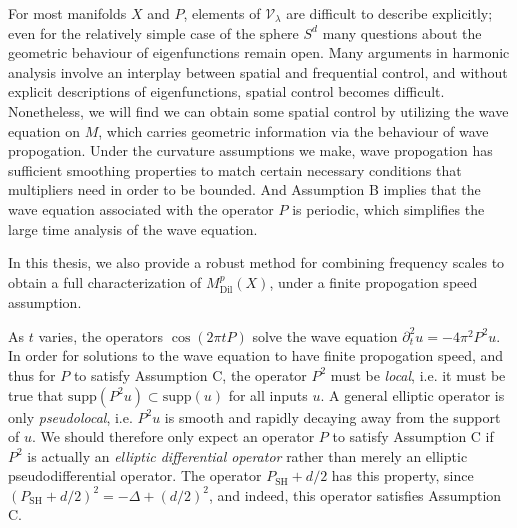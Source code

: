 % 

For most manifolds $X$ and $P$, elements of $\mathcal{V}_\lambda$ are difficult to describe explicitly; even for the relatively simple case of the sphere $S^d$ many questions about the geometric behaviour of eigenfunctions remain open. Many arguments in harmonic analysis involve an interplay between spatial and frequential control, and without explicit descriptions of eigenfunctions, spatial control becomes difficult. Nonetheless, we will find we can obtain some spatial control by utilizing the wave equation on $M$, which carries geometric information via the behaviour of wave propogation. Under the curvature assumptions we make, wave propogation has sufficient smoothing properties to match certain necessary conditions that multipliers need in order to be bounded. And Assumption B implies that the wave equation associated with the operator $P$ is periodic, which simplifies the large time analysis of the wave equation.

In this thesis, we also provide a robust method for combining frequency scales to obtain a full characterization of $M^p_{\text{Dil}}(X)$, under a finite propogation speed assumption.

\vspace{0.5em}

\noindent {}

\vspace{0.4em}

As $t$ varies, the operators $\cos(2 \pi t P)$ solve the wave equation $\partial_t^2 u = - 4 \pi^2 P^2 u$. In order for solutions to the wave equation to have finite propogation speed, and thus for $P$ to satisfy Assumption C, the operator $P^2$ must be \emph{local}, i.e. it must be true that $\text{supp}(P^2u) \subset \text{supp}(u)$ for all inputs $u$. A general elliptic operator is only \emph{pseudolocal}, i.e. $P^2u$ is smooth and rapidly decaying away from the support of $u$. We should therefore only expect an operator $P$ to satisfy Assumption C if $P^2$ is actually an \emph{elliptic differential operator} rather than merely an elliptic pseudodifferential operator. The operator $P_{\text{SH}} + d/2$ has this property, since $(P_{\text{SH}} + d/2)^2 = -\Delta + (d/2)^2$, and indeed, this operator satisfies Assumption C.

